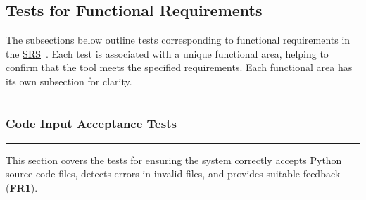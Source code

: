 \documentclass[12pt, titlepage]{article}
\newcommand{\SRS}{\href{https://github.com/ssm-lab/capstone--source-code-optimizer/blob/main/docs/SRS/SRS.pdf}{SRS}}
\newcommand{\colorrule}{\textcolor{BlueViolet}{\rule{\linewidth}{2pt}}}
\begin{document}
\subsection{Tests for Functional Requirements}

The subsections below outline tests corresponding to functional
requirements in the \SRS~\cite{SRS}. Each test is associated with a
unique functional area, helping to confirm that the tool meets the
specified requirements. Each functional area has its own subsection for clarity.

\noindent
\colorrule

\subsubsection{Code Input Acceptance Tests}
\colorrule

\medskip

\noindent
This section covers the tests for ensuring the system correctly
accepts Python source code files, detects errors in invalid files,
and provides suitable feedback (\textbf{FR1}).
\end{document}
